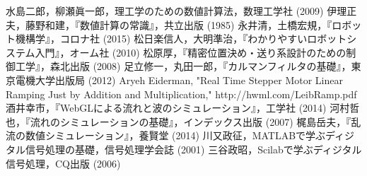 \documentclass[twocolumn,oneside,a4paper]{article}
\begin{document}




\begin{thebibliography}{99}
    水島二郎，柳瀬眞一郎，理工学のための数値計算法，数理工学社 (2009)
   伊理正夫，藤野和建，『数値計算の常識』，共立出版 (1985)
    永井清，土橋宏規，『ロボット機構学』，コロナ社 (2015)
     松日楽信人，大明準治，『わかりやすいロボットシステム入門』，オーム社 (2010)
     松原厚，『精密位置決め・送り系設計のための制御工学』，森北出版 (2008)
   足立修一，丸田一郎，『カルマンフィルタの基礎』，東京電機大学出版局 (2012)
   Aryeh Eiderman, "Real Time Stepper Motor Linear Ramping Just by Addition and Multiplication," http://hwml.com/LeibRamp.pdf
   酒井幸市，『WebGLによる流れと波のシミュレーション』，工学社 (2014)
   河村哲也，『流れのシミュレーションの基礎』，インデックス出版 (2007)
    梶島岳夫，『乱流の数値シミュレーション』，養賢堂 (2014)
    川又政征，MATLABで学ぶディジタル信号処理の基礎，信号処理学会誌 (2001)
    三谷政昭，Scilabで学ぶディジタル信号処理，CQ出版 (2006)
\end{thebibliography}
\end{document}
